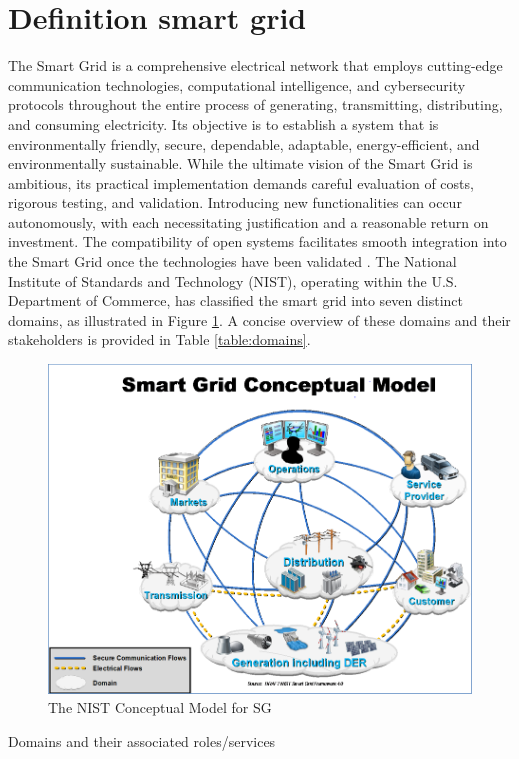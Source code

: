 \section{Definition smart grid}
The Smart Grid is a comprehensive electrical network that employs cutting-edge communication technologies, computational intelligence, and cybersecurity protocols throughout the entire process of generating, transmitting, distributing, and consuming electricity. Its objective is to establish a system that is environmentally friendly, secure, dependable, adaptable, energy-efficient, and environmentally sustainable. While the ultimate vision of the Smart Grid is ambitious, its practical implementation demands careful evaluation of costs, rigorous testing, and validation. Introducing new functionalities can occur autonomously, with each necessitating justification and a reasonable return on investment. The compatibility of open systems facilitates smooth integration into the Smart Grid once the technologies have been validated \cite{gharavi2011smart}.
 The National Institute of Standards and Technology (NIST), operating within the U.S. Department of Commerce, has classified the smart grid into seven distinct domains, as illustrated in Figure \ref{fig:NIST}. A concise overview of these domains and their stakeholders is provided in Table \ref{table:domains}.\cite{gopstein2021nist}
\begin{figure}[h]
	\centering
	\includegraphics[width=\textwidth]{figures/nist.PNG}
	\caption{The NIST Conceptual Model for SG \cite{gopstein2021nist}}
	\label{fig:NIST}
\end{figure}
\begin{table}[h]
    \centering

    
    \caption{Domains and their associated roles/services \cite{gopstein2021nist}}
    \label{table:domains}
\end{table}



